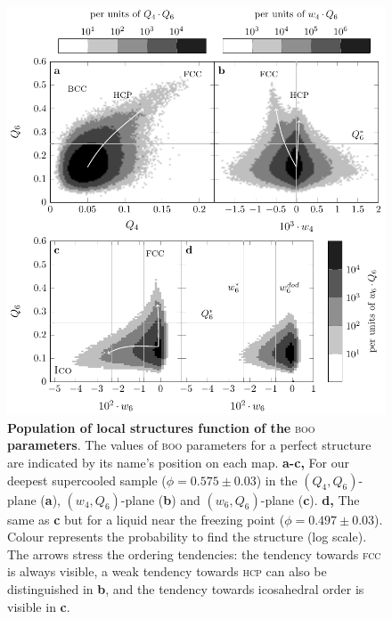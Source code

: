 \clearpage

\begin{figure}
\begin{center}
\includegraphics{generate_figures-figure1.pdf}
\end{center}
\caption{\textbf{Population of local structures function of the }\textsc{boo}\textbf{ parameters}. The values of \textsc{boo} parameters for a perfect structure are indicated by its name's position on each map. {\bf a-c,} For our deepest supercooled sample ($\phi=0.575\pm 0.03$) in the $(Q_4,Q_6)$-plane ({\bf a}), $(w_4,Q_6)$-plane ({\bf b}) and $(w_6,Q_6)$-plane ({\bf c}). {\bf d,} The same as {\bf c} but for a liquid near the freezing point ($\phi = 0.497 \pm 0.03$). Colour represents the probability to find the structure (log scale). The arrows stress the ordering tendencies: the tendency towards \textsc{fcc} is always visible, a weak tendency towards \textsc{hcp} can also be distinguished in {\bf b}, and the tendency towards icosahedral order is visible in {\bf c}.}
	\label{fig:maps}
\end{figure}

\clearpage

